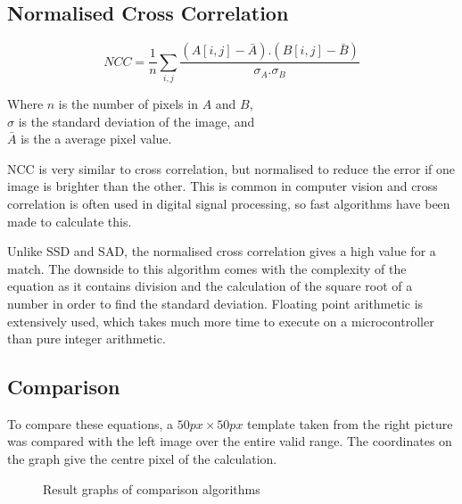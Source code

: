 \subsection{Normalised Cross Correlation}\label{Section:NCC}
\begin{equation}\label{eq:NCC}
NCC =  \frac{1}{n}\sum\limits_{i,j} \frac{(A[i,j] - \bar{A}).(B[i,j] - \bar{B})}{\sigma _A . \sigma _B}
\end{equation}
\begin{center}
Where $n$ is the number of pixels in $A$ and $B$, \\$\sigma$ is the standard deviation of the image, and \\$\bar{A}$ is the a average pixel value. 
\end{center}
NCC is very similar to cross correlation, but normalised to reduce the error if one image is brighter than the other. This is common in computer vision \citep{Tsai:NCC} and cross correlation is often used in digital signal processing, so fast algorithms have been made to calculate this. 

Unlike SSD and SAD, the normalised cross correlation gives a high value for a match. The downside to this algorithm comes with the complexity of the equation as it contains division and the calculation of the square root of a number in order to find the standard deviation. 
Floating point arithmetic is extensively used, which takes much more time to execute on a microcontroller than pure integer arithmetic.



\subsection{Comparison}

To compare these equations, a $50px \times 50px$ template taken from the right picture was compared with the left image over the entire valid range. The coordinates on the graph give the centre pixel of the calculation. 

\begin{figure}
\centering
{}
\caption{Result graphs of comparison algorithms}
\label{fg:CompResults}
\end{figure}

